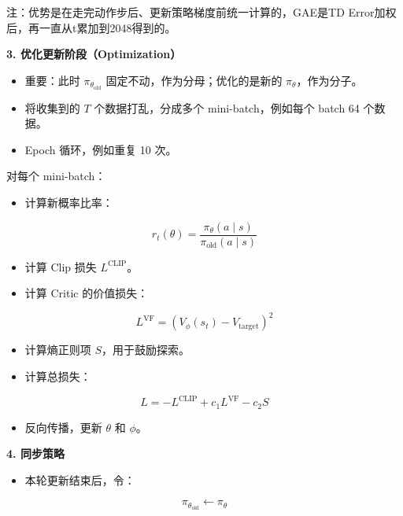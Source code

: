 注：优势是在走完动作步后、更新策略梯度前统一计算的，GAE是TD Error加权后，再一直从t累加到2048得到的。

\textbf{3. 优化更新阶段（Optimization）}

\begin{itemize}
\tightlist
\item
  重要：此时 \(\pi_{\theta_{\mathrm{old}}}\) 固定不动，作为分母；优化的是新的 \(\pi_\theta\)，作为分子。
\item
  将收集到的 \(T\) 个数据打乱，分成多个 mini-batch，例如每个 batch 64 个数据。
\item
  Epoch 循环，例如重复 10 次。
\end{itemize}

对每个 mini-batch：

\begin{itemize}
\tightlist
\item
  计算新概率比率：
\end{itemize}

\[
r_t(\theta)=\frac{\pi_\theta(a\mid s)}{\pi_{\mathrm{old}}(a\mid s)}
\]

\begin{itemize}
\tightlist
\item
  计算 Clip 损失 \(L^{\mathrm{CLIP}}\)。
\item
  计算 Critic 的价值损失：
\end{itemize}

\[
L^{\mathrm{VF}}=\left(V_\phi(s_t)-V_{\mathrm{target}}\right)^{2}
\]

\begin{itemize}
\tightlist
\item
  计算熵正则项 \(S\)，用于鼓励探索。
\item
  计算总损失：
\end{itemize}

\[
L=-L^{\mathrm{CLIP}}+c_1L^{\mathrm{VF}}-c_2S
\]

\begin{itemize}
\tightlist
\item
  反向传播，更新 \(\theta\) 和 \(\phi\)。
\end{itemize}

\textbf{4. 同步策略}

\begin{itemize}
\tightlist
\item
  本轮更新结束后，令：
\end{itemize}

\[
\pi_{\theta_{\mathrm{old}}}\leftarrow\pi_\theta
\]

